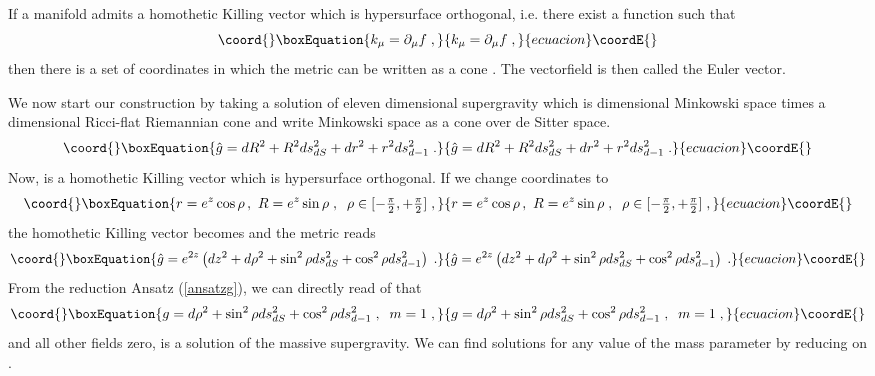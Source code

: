 \documentclass[a4paper,12pt]{article}
\providecommand{\ft}[2]{{\textstyle\frac{#1}{#2}}}
\begin{document}
If a manifold admits a homothetic Killing vector \coordHE{} which is hypersurface orthogonal, i.e. there exist a function \coordHE{} such that
\begin{equation}\coord{}\boxEquation{
k_\mu=\partial_\mu f \; ,
}{
k_\mu=\partial_\mu f \; ,
}{ecuacion}\coordE{}\end{equation}
then there is a set of coordinates in which the metric can be written as a cone \cite{Gibbons:1998xa}. The vectorfield \coordHE{} is then called the Euler vector. 

We now start our construction by taking a solution of eleven dimensional supergravity which is \coordHE{} dimensional Minkowski space times a \coordHE{} dimensional Ricci-flat Riemannian cone and write Minkowski space as a cone over de Sitter space.
\begin{equation}\coord{}\boxEquation{\label{g2}
\hat{g}=dR^2+R^2ds^2_{dS}+dr^2+r^2 ds^2_{d-1}\; .
}{\hat{g}=dR^2+R^2ds^2_{dS}+dr^2+r^2 ds^2_{d-1}\; .
}{ecuacion}\coordE{}\end{equation}
Now, \coordHE{} is a homothetic Killing vector which is hypersurface orthogonal.
If we change coordinates to
\begin{equation}\coord{}\boxEquation{
r=e^z \cos \rho\, , \, \, R=e^z \sin \rho\; , \;\; \rho \in [-\ft{\pi}2,+\ft{\pi}2] \; ,
}{
r=e^z \cos \rho\, , \, \, R=e^z \sin \rho\; , \;\; \rho \in [-\ft{\pi}2,+\ft{\pi}2] \; ,
}{ecuacion}\coordE{}\end{equation}
the homothetic Killing vector becomes \coordHE{} and the metric reads
\begin{equation}\coord{}\boxEquation{
\hat{g}=e^{2z}\left(dz^2+d\rho^2+\sin^2 \rho ds_{dS}^2+\cos^2 \rho ds^2_{d-1} \right) \; .
}{
\hat{g}=e^{2z}\left(dz^2+d\rho^2+\sin^2 \rho ds_{dS}^2+\cos^2 \rho ds^2_{d-1} \right) \; .
}{ecuacion}\coordE{}\end{equation}
From the reduction Ansatz (\ref{ansatzg}), we can directly read of that 
\begin{equation}\coord{}\boxEquation{
g=d\rho^2+\sin^2 \rho ds_{dS}^2+\cos^2 \rho ds^2_{d-1}\; , \; \; m=1 \; ,
}{
g=d\rho^2+\sin^2 \rho ds_{dS}^2+\cos^2 \rho ds^2_{d-1}\; , \; \; m=1 \; ,
}{ecuacion}\coordE{}\end{equation}
and all other fields zero, is a solution of the massive supergravity. We can find solutions for any value of the mass parameter by reducing on \coordHE{}.
\end{document}
